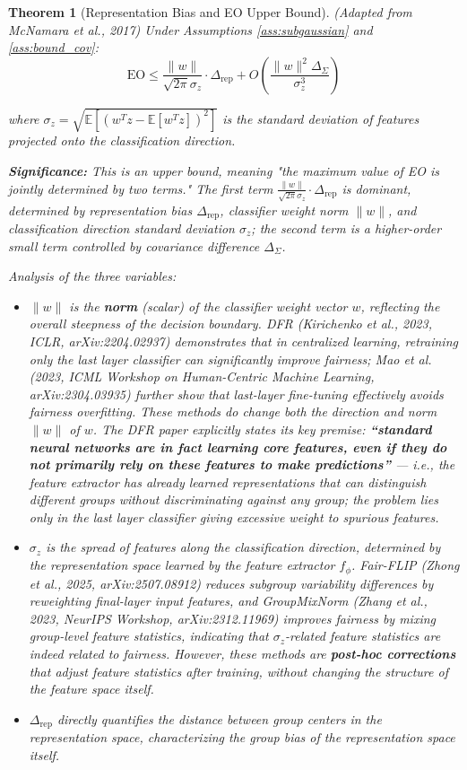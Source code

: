 \documentclass[11pt]{article}
\newtheorem{theorem}{Theorem}
\begin{document}
\begin{theorem}[Representation Bias and EO Upper Bound]
\label{thm:rep_eo}
\textit{(Adapted from McNamara et al., 2017)} Under Assumptions \ref{ass:subgaussian} and \ref{ass:bound_cov}:
$$\mathrm{EO} \leq \frac{\|w\|}{\sqrt{2\pi}\sigma_z} \cdot \Delta_{\mathrm{rep}} + O\left(\frac{\|w\|^2 \Delta_{\Sigma}}{\sigma_z^3}\right)$$

where $\sigma_z = \sqrt{\mathbb{E}\left[(w^T z - \mathbb{E}[w^T z])^2\right]}$ is the standard deviation of features projected onto the classification direction. 

\textbf{Significance:} This is an \textit{upper bound}, meaning "the maximum value of EO is jointly determined by two terms." The first term $\frac{\|w\|}{\sqrt{2\pi}\sigma_z} \cdot \Delta_{\mathrm{rep}}$ is dominant, determined by representation bias $\Delta_{\mathrm{rep}}$, classifier weight norm $\|w\|$, and classification direction standard deviation $\sigma_z$; the second term is a higher-order small term controlled by covariance difference $\Delta_{\Sigma}$.

Analysis of the three variables:

\begin{itemize}
    \item $\|w\|$ is the \textbf{norm} (scalar) of the classifier weight vector $w$, reflecting the overall steepness of the decision boundary. DFR (Kirichenko et al., 2023, ICLR, arXiv:2204.02937) demonstrates that in centralized learning, retraining only the last layer classifier can significantly improve fairness; Mao et al. (2023, ICML Workshop on Human-Centric Machine Learning, arXiv:2304.03935) further show that last-layer fine-tuning effectively avoids fairness overfitting. These methods do change both the direction and norm $\|w\|$ of $w$. The DFR paper explicitly states its key premise: \textbf{``standard neural networks are in fact learning core features, even if they do not primarily rely on these features to make predictions''} --- i.e., the feature extractor has already learned representations that can distinguish different groups without discriminating against any group; the problem lies only in the last layer classifier giving excessive weight to spurious features.
    \item $\sigma_z$ is the spread of features along the classification direction, determined by the representation space learned by the feature extractor $f_\phi$. Fair-FLIP (Zhong et al., 2025, arXiv:2507.08912) reduces subgroup variability differences by reweighting final-layer input features, and GroupMixNorm (Zhang et al., 2023, NeurIPS Workshop, arXiv:2312.11969) improves fairness by mixing group-level feature statistics, indicating that $\sigma_z$-related feature statistics are indeed related to fairness. However, these methods are \textbf{post-hoc corrections} that adjust feature statistics after training, without changing the structure of the feature space itself.
    \item $\Delta_{\mathrm{rep}}$ directly quantifies the distance between group centers in the representation space, characterizing the group bias of the representation space itself.
\end{itemize}


\end{theorem}
\end{document}
